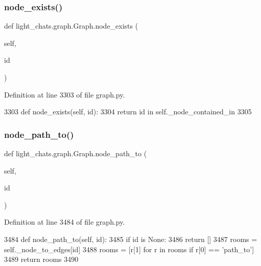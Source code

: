 \subsubsection{\texorpdfstring{node\+\_\+exists()}{node\_exists()}}
{\footnotesize\ttfamily def light\+\_\+chats.\+graph.\+Graph.\+node\+\_\+exists (\begin{DoxyParamCaption}\item[{}]{self,  }\item[{}]{id }\end{DoxyParamCaption})}



Definition at line 3303 of file graph.\+py.


\begin{DoxyCode}
3303     \textcolor{keyword}{def }node\_exists(self, id):
3304         \textcolor{keywordflow}{return} id \textcolor{keywordflow}{in} self.\_node\_contained\_in
3305 
\end{DoxyCode}
\mbox{\label{classlight__chats_1_1graph_1_1Graph_a20da62a3d5411d93fe820accdd06fa33}} 
\subsubsection{\texorpdfstring{node\+\_\+path\+\_\+to()}{node\_path\_to()}}
{\footnotesize\ttfamily def light\+\_\+chats.\+graph.\+Graph.\+node\+\_\+path\+\_\+to (\begin{DoxyParamCaption}\item[{}]{self,  }\item[{}]{id }\end{DoxyParamCaption})}



Definition at line 3484 of file graph.\+py.


\begin{DoxyCode}
3484     \textcolor{keyword}{def }node\_path\_to(self, id):
3485         \textcolor{keywordflow}{if} id \textcolor{keywordflow}{is} \textcolor{keywordtype}{None}:
3486             \textcolor{keywordflow}{return} []
3487         rooms = self.\_node\_to\_edges[id]
3488         rooms = [r[1] \textcolor{keywordflow}{for} r \textcolor{keywordflow}{in} rooms \textcolor{keywordflow}{if} r[0] == \textcolor{stringliteral}{'path\_to'}]
3489         \textcolor{keywordflow}{return} rooms
3490 
\end{DoxyCode}
\mbox{\label{classlight__chats_1_1graph_1_1Graph_a9ed5168f4d2a93b6a9f3f3ddd07660d4}} 
